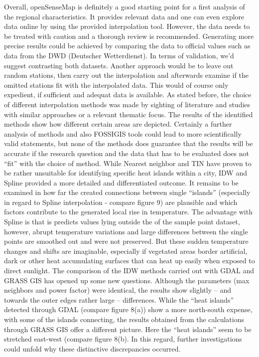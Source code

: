 Overall, openSenseMap is definitely a good starting point for a first analysis of the regional characteristics. It provides relevant data and one can even explore data online by using the provided interpolation tool. However, the data needs to be treated with caution and a thorough review is recommended. Generating more precise results could be achieved by comparing the data to official values such as data from the DWD (Deutscher Wetterdienst).  
In terms of validation, we’d suggest contrasting both datasets. Another approach would be to leave out random stations, then carry out the interpolation and afterwards examine if the omitted stations fit with the interpolated data. This would of course only expedient, if sufficient and adequat data is available. 
As stated before, the choice of different interpolation methods was made by sighting of literature and studies with similar approaches or a relevant thematic focus. The results of the identified methods show how different certain areas are depicted. Certainly a further analysis of methods and also FOSSIGIS tools could lead to more scientifically valid statements, but none of the methods does guarantee that the results will be accurate if the research question and the data that has to be evaluated does not “fit” with the choice of method. 
While Nearest neighbor and TIN have proven to be rather unsuitable for identifying specific heat islands within a city, IDW and Spline provided a more detailed and differentiated outcome. It remains to be examined in how far the created connections between single “islands” (especially in regard to Spline interpolation - compare figure 9) are plausible and which factors contribute to the generated local rise in temperature. The advantage with Spline is that is predicts values lying outside the of the sample point dataset, however, abrupt temperature variations and large differences between the single points are smoothed out and were not preserved. But these sudden temperature changes and shifts are imaginable, especially if vegetated areas border artificial, dark or other heat accumulating surfaces that can heat up easily when exposed to direct sunlight. 
The comparison of the IDW methods carried out with GDAL and GRASS GIS has opened up some new questions. Although the parameters (max neighbors and power factor) were identical, the results show slightly – and towards the outer edges rather large – differences. While the “heat islands” detected through GDAL (compare figure 8(a)) show a more north-south expense, with some of the islands connecting, the results obtained from the calculations through GRASS GIS offer a different picture. Here the “heat islands” seem to be stretched east-west (compare figure 8(b). In this regard, further investigations could unfold why these distinctive discrepancies occurred. 

